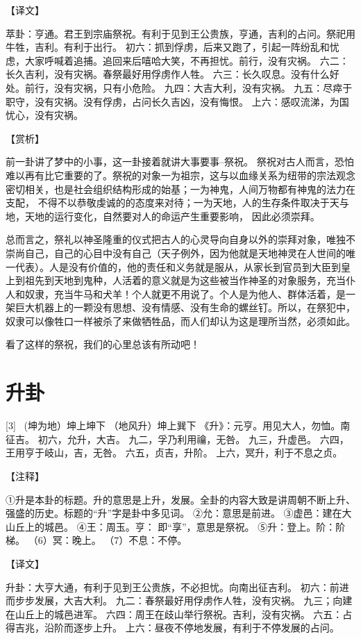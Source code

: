 \documentclass[12pt,UTF8]{ctexbook}
\begin{document}
【译文】

萃卦：亨通。君王到宗庙祭祝。有利于见到王公贵族，亨通，吉利的占问。祭祀用牛牲，吉利。有利于出行。
初六：抓到俘虏，后来又跑了，引起一阵纷乱和忧虑，大家呼喊着追捕。追回来后嘻哈大笑，不再担忧。前行，没有灾祸。
六二：长久吉利，没有灾祸。春祭最好用俘虏作人牲。
六三：长久叹息。没有什么好处。前行，没有灾祸，只有小危险。
九四：大吉大利，没有灾祸。
九五：尽瘁于职守，没有灾祸。没有俘虏，占问长久吉凶，没有悔恨。
上六：感叹流涕，为国忧心，没有灾祸。

【赏析】

前一卦讲了梦中的小事，这一卦接着就讲大事要事--祭祝。 祭祝对古人而言，恐怕难以再有比它重要的了。祭祝的对象一为祖宗，这与以血缘关系为纽带的宗法观念密切相关，也是社会组织结构形成的始基；一为神鬼，人间万物都有神鬼的法力在支配， 不得不以恭敬虔诚的的态度来对待；一为天地，人的生存条件取决于天与地，天地的运行变化，自然要对人的命运产生重要影响， 因此必须崇拜。

总而言之，祭礼以神圣隆重的仪式把古人的心灵导向自身以外的崇拜对象，唯独不崇尚自己，自己的心目中没有自己（天子例外，因为他就是天地神灵在人世间的唯一代表）。人是没有价值的，他的责任和义务就是服从，从家长到官员到大臣到皇上到祖先到天地到鬼种，人活着的意义就是为这些被当作神圣的对象服务，充当仆人和奴隶，充当牛马和犬羊！个人就更不用说了。个人是为他人、群体活着，是一架巨大机器上的一颗没有思想、没有情感、没有生命的螺丝钉。所以，在祭犯中，奴隶可以像牲口一样被杀了来做牺牲品，而人们却认为这是理所当然，必须如此。

看了这样的祭祝，我们的心里总该有所动吧！

\chapter{升卦}
[3] \ (坤为地）坤上坤下
（地风升）坤上巽下
《升》：元亨。用见大人，勿恤。南征吉。
初六，允升，大吉。
九二，孚乃利用禴，无咎。
九三，升虚邑。
六四，王用亨于岐山，吉，无咎。
六五，贞吉，升阶。
上六，冥升，利于不息之贞。

【注释】

①升是本卦的标题。升的意思是上升，发展。全卦的内容大致是讲周朝不断上升、强盛的历史。标题的“升”字是卦中多见词。
②允：意思是前进。
③虚邑：建在大山丘上的城邑。
④王：周玉。亨： 即“享”，意思是祭祝。
⑤升：登上。阶：阶梯。
（6）冥：晚上。
（7）不息：不停。

【译文】

升卦：大亨大通，有利于见到王公贵族，不必担忧。向南出征吉利。
初六：前进而步步发展，大吉大利。
九二：春祭最好用俘虏作人牲，没有灾祸。
九三；向建在山丘上的城邑进军。
六四：周王在歧山举行祭祝。吉利，没有灾祸。
六五：占得吉兆，沿阶而逐步上升。
上六：昼夜不停地发展，有利于不停发展的占问。
\end{document}
